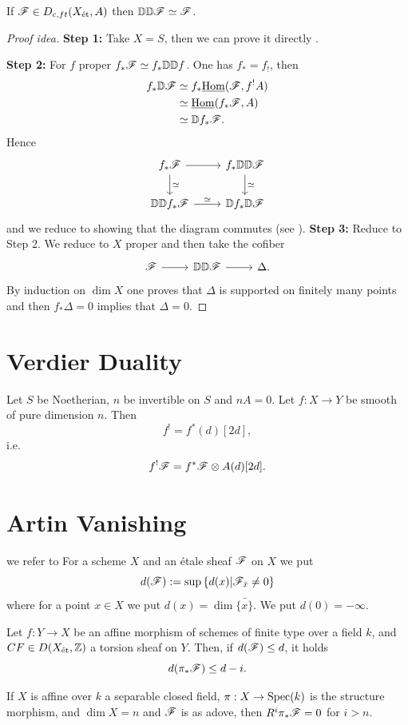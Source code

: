 \documentclass[oneside]{amsart}
\begin{document}
\begin{theorem}[{\cite[Chapter 9.6]{Fu}}]\cite{Fu}
	If $\mathscr{F}\in D_{c,ft}(X_{\mathrm{\acute{e}t}},A)$ then $\mathbb{D}\mathbb{D}\mathscr{F}\simeq \mathscr{F}$.
\end{theorem}
\begin{proof}[Proof idea]
	\textbf{Step 1:} Take $X=S$, then we can prove it directly \cite[Lemma 9.6.2]{Fu}.

	\textbf{Step 2:} For $f$ proper $f_*\mathscr{F}\simeq f_*\mathbb{D}\mathbb{D} f$. One has $f_*=f_!$, then
	\begin{align*}
		f_*\mathbb{D}\mathscr{F} &\simeq f_*\underline{\operatorname{Hom}}(\mathscr{F},f^{!}A) \\
		&\simeq \underline{\operatorname{Hom}}(f_*\mathscr{F},A) \\
		&\simeq \mathbb{D} f_*\mathscr{F}.
	\end{align*}
	Hence
	\[
		\begin{tikzcd}
			f_*\CF \ar[r] \ar[d,"\isoto"] & f_*\VD\VD\CF \ar[d,"\isoto"] \\
			\VD\VD f_*\CF \ar[r,"\isoto"] & \VD f_*\VD\CF
		\end{tikzcd}
	\]
	and we reduce to showing that the diagram commutes (see \cite[Lemma 9.6.3]{Fu}).
	\textbf{Step 3:} Reduce to Step 2. We reduce to $X$ proper and then take the cofiber
	\[
		\begin{tikzcd}
			\CF \ar[r] & \VD \VD \CF \ar[r] & \Delta.
		\end{tikzcd}
	\]
	By induction on $\dim X$ one proves that $\Delta$ is supported on finitely many points
	and then $f_*\Delta=0$ implies that $\Delta=0$.
\end{proof}

\section{Verdier Duality}
Let $S$ be Noetherian, $n$ be invertible on $S$ and $nA=0$. Let $f:X\to Y$ be smooth of
pure dimension $n$. Then
\[
	f^{!} = f^{*}(d)[2d],
\]
i.e.
\[
	f^{!}\mathscr{F} = f^{*}\mathscr{F} \otimes A(d)[2d].
\]

\section{Artin Vanishing}
we refer to \cite[VI.7]{Milne_etale}
For a scheme $X$ and an étale sheaf $\mathscr{F}$ on $X$ we put
\[ d(\mathscr{F}):=\sup\left\{ d(x)|\mathscr{F}_{\bar{x}}\ne 0 \right\} \]
where for a point $x\in X$ we put $d(x)=\dim\bar{\{x\}}$. We put $d(0)=-\infty$.
\begin{theorem}
	Let $f:Y\to X$ be an affine morphism of schemes of finite type over a field $k$, and
	$CF\in D(X_{\mathrm{\acute{e}t}},\mathbb Z)$ a torsion sheaf on $Y$. Then, if $d(\mathscr{F})\le d$, it holds
	\[
		d(\pi_*\mathscr{F})\le d-i.
	\]
\end{theorem}
\begin{corollary}
	If $X$ is affine over $k$ a separable closed field, $\pi:X\to \Spec(k)$ is the structure
	morphism, and $\dim X=n$ and $\mathscr{F}$ is as adove, then $R^{i}\pi_*\mathscr{F}=0$ for $i>n$.
\end{corollary}

\printbibliography
\end{document}
